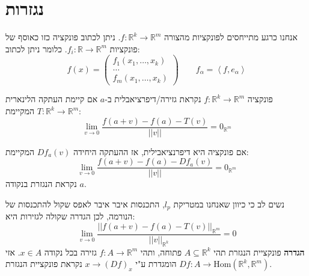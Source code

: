 \documentclass{tstextbook}
\begin{document}
\section{נגזרות}

אנחנו כרגע מתייחסים לפונקציות מהצורה \(f:\mathbb{R}^k\to\mathbb{R}^m\). ניתן לכתוב פונקציה כזו כאוסף של פונקציות \(f_{i}:\mathbb{R}\to\mathbb{R}^m\). כלומר ניתן לכתוב:
$$f(x)=\begin{pmatrix}{{f_{1}\left(x_{1},\ldots,x_{k}\right)}}\\ {{\ldots}}\\ {{f_{m}\!\left(x_{1},\ldots,x_{k}\right)}}
\end{pmatrix} \qquad  f_{\alpha}=\left\langle f,e_{\alpha}\right\rangle$$

\begin{definition}[דיפרנציאבליות]
פונקציה \(f:\mathbb{R}^k\to\mathbb{R}^m\) נקראת גזירה/דיפרציאבלית ב-\(a\) אם קיימת העתקה הלינארית \(T:\mathbb{R}^k\to\mathbb{R}^m\) המקיימת:
$$\operatorname*{lim}_{v\to0}{\frac{f(a+v)-f(a)-T(v)}{||v||}}=0_{\mathbb{R}^m}$$

\end{definition}
\begin{definition}
אם פונקציה היא דיפרנציאבילית, אז ההעתקה היחידה \(Df_{a}(v)\) המקיימת:
$$\operatorname*{lim}_{v\to0}{\frac{f(a+v)-f(a)-Df_{a}(v)}{||v||}}=0_{\mathbb{R}^m}$$
נקראת הנגזרת בנקודה \(a\). 

\end{definition}
נשים לב כי כיוון שאנחנו במטריקת \(l_{p}\), התכנסות איבר איבר לאפס שקול להתכנסות של הנורמה, לכן הגדרה שקולה לגזירות היא:
$$\lim_{ v \to 0 } \frac{||f(a+v)-f(a)-T(v)||_{\mathbb{R}^m}}{||v||_{\mathbb{R}^k}}=0$$\textbf{הגדרה} פונקציית הנגזרת
תהי \(A\subseteq \mathbb{R}^k\) פתוחה, ותהי \(f:A\to\mathbb{R}^m\) גזירה בכל נקודה \(x \in A\). אזי \(Df:A\to \mathrm{Hom}\left( \mathbb{R}^k,\mathbb{R}^m \right)\) הומגדרת ע"י \(x\to (Df)_{x}\) נקראת פונקציית הנגזרת.
\end{document}
